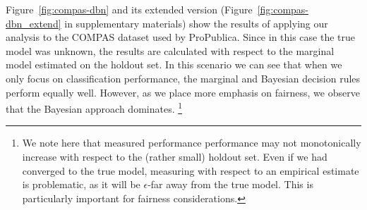 Figure~\ref{fig:compas-dbn} and its extended version (Figure~\ref{fig:compas-dbn_extend} in supplementary materials) show the results of applying our analysis
to the COMPAS dataset used by ProPublica. Since in this case the true
model was unknown, the results are calculated with respect to the
marginal model estimated on the holdout set. In this scenario we can see that when we only focus on classification performance, the marginal and Bayesian decision rules perform equally well. However, as we place more emphasis on fairness, we observe that the Bayesian approach dominates.
\footnote{We note here that measured performance performance may not monotonically increase with respect to the (rather small) holdout set. Even if we had converged to the true model, measuring with respect to an empirical estimate is problematic, as it will be $\epsilon$-far away from the true model. This is particularly important for fairness considerations.}

\begin{figure*}
\centering
%    
  \subfloat[$\lambda=0.25$]{
    
  }
  \subfloat[$\lambda=0.5$]{
    
  }
  \subfloat[$\lambda=0.75$]{
    
  }
%    
  \subfloat[legend]{
    \raisebox{4em}{}
  }
  \caption{\textbf{Synthetic data, utility-fairness trade-off.} This plot is generated from the same data as Figure~\ref{fig_exp_1}. However, now we are plotting the utility and fairness of each individual policy separately. In all cases, it can be seen that the Bayesian policy achieves the same utility as the non-Bayesian policy, while achieving a lower fairness violation.}
  \label{fig_exp_1:tradeoff}
\end{figure*}

